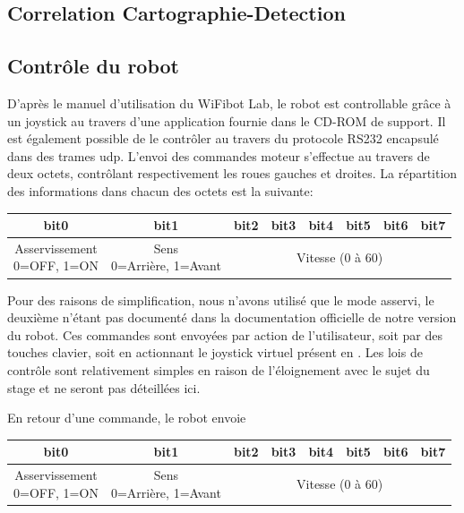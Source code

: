 		\subsection{Correlation Cartographie-Detection}
		
			\lipsum[2]
			
		\subsection{Contrôle du robot}
		
			D'après le manuel d'utilisation du WiFibot Lab\cite{wifibot}, le robot est controllable grâce à un joystick au travers d'une application fournie dans le CD-ROM de support. Il est également possible de le contrôler au travers du protocole RS232\cite{rs232} encapsulé dans des trames \gls{udp}. L'envoi des commandes moteur s'effectue au travers de deux octets, contrôlant respectivement les roues gauches et droites. La répartition des informations dans chacun des octets est la suivante:
			\begin{center}
				\scriptsize
				\begin{tabular}[h]{|c||c||c|c|c|c|c|c|}
					\toprule
					bit0 & bit1 & bit2 & bit3 & bit4 & bit5 & bit6 & bit7 \\
					\midrule
					\specialcell{Asservissement\\ 0=OFF, 1=ON} &
					\specialcell{Sens\\ 0=Arrière, 1=Avant} &
					\multicolumn{6}{c|}{Vitesse (0 à 60)} \\
					\bottomrule
				\end{tabular}
			\end{center}
			Pour des raisons de simplification, nous n'avons utilisé que le mode asservi, le deuxième n'étant pas documenté dans la documentation officielle de notre version du robot.
			Ces commandes sont envoyées par action de l'utilisateur, soit par des touches clavier, soit en actionnant le joystick virtuel présent en \todoref.
			Les lois de contrôle sont relativement simples en raison de l'éloignement avec le sujet du stage et ne seront pas déteillées ici.
			\par
			En retour d'une commande, le robot envoie
			\begin{center}
				\scriptsize
				\begin{tabular}[h]{|c||c||c|c|c|c|c|c|}
					\toprule
					bit0 & bit1 & bit2 & bit3 & bit4 & bit5 & bit6 & bit7 \\
					\midrule
					\specialcell{Asservissement\\ 0=OFF, 1=ON} &
					\specialcell{Sens\\ 0=Arrière, 1=Avant} &
					\multicolumn{6}{c|}{Vitesse (0 à 60)} \\
					\bottomrule
				\end{tabular}
			\end{center}
			
